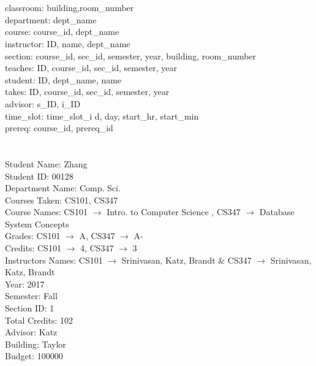 \documentclass[12pt]{article}
\begin{document}
\maketitle


\section{}

classroom: building,room\_number \\
department: dept\_name \\
course: course\_id, dept\_name \\
instructor: ID, name, dept\_name \\
section: course\_id, sec\_id, semester, year, building, room\_number \\
teaches: ID, course\_id, sec\_id, semester, year \\
student: ID, dept\_name, name \\
takes: ID, course\_id, sec\_id, semester, year \\
advisor: s\_ID, i\_ID \\
time\_slot: time\_slot\_i d, day, start\_hr, start\_min \\
prereq: course\_id, prereq\_id \\

\section{}
Student Name: Zhang \\
Student ID: 00128 \\
Department Name: Comp. Sci. \\
Courses Taken: CS101, CS347 \\
Course Names: CS101 $\rightarrow{}$ Intro. to Computer Science , CS347 $\rightarrow{}$ Database System  Concepts\\
Grades: CS101 $\rightarrow{}$ A, CS347 $\rightarrow{}$ A- \\
Credits: CS101 $\rightarrow{}$ 4, CS347 $\rightarrow{}$ 3 \\
Instructors Names: CS101 $\rightarrow{}$ Srinivasan, Katz, Brandt \& CS347 $\rightarrow{}$ Srinivasan, Katz, Brandt \\
Year: 2017 \\
Semester: Fall \\
Section ID: 1 \\
Total Credits: 102 \\
Advisor: Katz \\
Building: Taylor \\
Budget: 100000 \\
\end{document}
